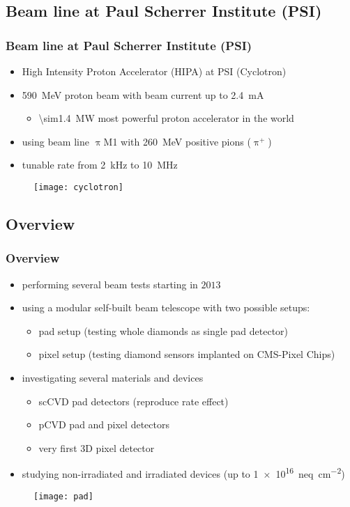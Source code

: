 \subsection{Beam line at Paul Scherrer Institute (PSI)}
\begin{frame}
	\frametitle{Beam line at Paul Scherrer Institute (PSI)}
	\begin{itemize}
		\setlength{\itemsep}{\fill}
		\item High Intensity Proton Accelerator (HIPA) at PSI (Cyclotron)
		\item \SI{590}{\mega\electronvolt} proton beam with beam current up to \SI{2.4}{\milli\ampere}
		\begin{itemize}
			\vspace*{4pt}
			\item \SI{\sim1.4}{\mega\watt} \ra most powerful proton accelerator in the world
		\end{itemize}
		\item using beam line $\uppi$M1 with \SI{260}{\mega\electronvolt} positive pions ($\uppi^+$)
		\item tunable rate from \SI{2}{\kilo\hertz} to \SI{10}{\mega\hertz}
	\end{itemize}
	\begin{figure}
		\centering
		\texttt{[image: cyclotron]}
	\end{figure}
\end{frame}
\subsection{Overview}
\begin{frame}
	\frametitle{Overview}
	\begin{itemize}
		\item performing several beam tests starting in $2013$
		\item using a modular self-built beam telescope with two possible setups:
			\begin{itemize}
				\item pad setup (testing whole diamonds as single pad detector)
				\item pixel setup (testing diamond sensors implanted on CMS-Pixel Chips)
			\end{itemize}
		\item investigating several materials and devices
		\begin{itemize}
			\item scCVD pad detectors (reproduce rate effect)
			\item pCVD pad and pixel detectors
			\item very first 3D pixel detector
		\end{itemize}
		\item studying non-irradiated and irradiated devices (up to \SI{1e16}{neq\per cm^2})
	\end{itemize}
	\begin{figure}
		\centering
		\texttt{[image: pad]}
	\end{figure}
\end{frame}
